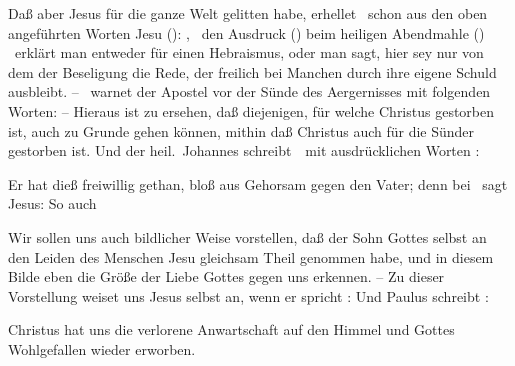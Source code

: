 \begin{aufza}
\begin{aufzb}
\item Daß aber Jesus für die ganze Welt gelitten habe, erhellet \zB\ schon aus den oben angeführten Worten Jesu (): , \usw\ den Ausdruck  () beim heiligen Abendmahle () \uaO\ erklärt man entweder für einen Hebraismus, oder man sagt, hier sey nur von dem  der Beseligung die Rede, der freilich bei Manchen durch ihre eigene Schuld ausbleibt. -- \ warnet der Apostel vor der Sünde des Aergernisses mit folgenden Worten:  -- Hieraus ist zu ersehen, daß diejenigen, für welche Christus gestorben ist, auch zu Grunde gehen können, mithin daß Christus auch für die Sünder gestorben ist. Und der heil.\ Johannes schreibt~\ mit ausdrücklichen Worten : 
\item Er hat dieß freiwillig gethan, bloß aus Gehorsam gegen den Vater; denn bei \ sagt Jesus:  So auch 
\item Wir sollen uns auch bildlicher Weise vorstellen, daß der Sohn Gottes selbst an den Leiden des Menschen Jesu gleichsam Theil genommen habe, und in diesem Bilde eben die Größe der Liebe Gottes gegen uns erkennen. -- Zu dieser Vorstellung weiset uns Jesus selbst an, wenn er spricht :  Und Paulus schreibt : 
\end{aufzb}
\item Christus hat uns die verlorene Anwartschaft auf den Himmel und Gottes Wohlgefallen wieder erworben. \ 

\end{aufza}
